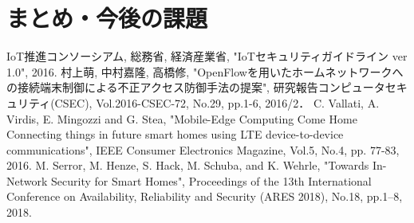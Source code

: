 \documentclass[a4paper,10pt,twocolumn,uplatex]{jsarticle}
\begin{document}
\section{まとめ・今後の課題}

\footnotesize{
  \begin{thebibliography}{99}
     IoT推進コンソーシアム, 総務省, 経済産業省, "IoTセキュリティガイドライン ver 1.0", 2016.
     村上萌, 中村嘉隆, 高橋修, "OpenFlowを用いたホームネットワークへの接続端末制御による不正アクセス防御手法の提案", 研究報告コンピュータセキュリティ(CSEC), Vol.2016-CSEC-72, No.29, pp.1-6, 2016/2．
     C. Vallati, A. Virdis, E. Mingozzi and G. Stea, "Mobile-Edge Computing Come Home Connecting things in future smart homes using LTE device-to-device communications", IEEE Consumer Electronics Magazine, Vol.5, No.4, pp. 77-83, 2016.
     M. Serror, M. Henze, S. Hack, M. Schuba, and K. Wehrle, "Towards In-Network Security for Smart Homes", Proceedings of the 13th International Conference on Availability, Reliability and Security (ARES 2018), No.18, pp.1–8, 2018.
  \end{thebibliography}
}

\end{document}
